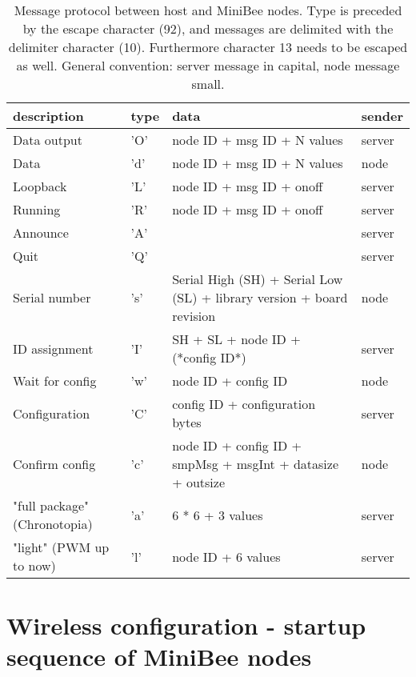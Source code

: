 \documentclass[letterpaper,10pt]{article}
\begin{document}
\begin{table}
 
\begin{center}
\begin{tabular}{llll}
description & type & data & sender\\
\hline
Data output & 'O' & node ID + msg ID + N values & server\\
Data & 'd' & node ID + msg ID + N values & node\\
Loopback & 'L' & node ID + msg ID + onoff & server\\
Running & 'R' & node ID + msg ID + onoff & server\\
\hline
Announce & 'A' &  & server \\
Quit & 'Q' &  & server \\
Serial number & 's' & Serial High (SH) + Serial Low (SL) + library version + board revision & node\\
ID assignment & 'I' & SH + SL + node ID + (*config ID*) & server \\
Wait for config & 'w' & node ID + config ID & node \\
Configuration & 'C' & config ID + configuration bytes & server \\
Confirm config & 'c' & node ID + config ID + smpMsg + msgInt + datasize + outsize & node \\
\hline
"full package" (Chronotopia) & 'a' & 6 * 6 + 3 values & server \\
"light" (PWM up to now)      & 'l' & node ID + 6 values & server
\end{tabular}
\end{center}
\caption{Message protocol between host and MiniBee nodes. Type is preceded by the escape character (92), and messages are delimited with the delimiter character (10). Furthermore character 13 needs to be escaped as well. General convention: server message in capital, node message small.}
\end{table}


\section{Wireless configuration - startup sequence of MiniBee nodes}
\end{document}
